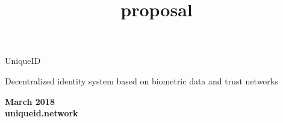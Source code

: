 \documentclass{article}
\title{proposal}
\begin{document}
\begin{titlepage}
\begin{center}
\begin{Huge}
UniqueID
\end{Huge}

\vspace{45mm}

\begin{huge}
Decentralized identity system based on biometric data and trust networks
\end{huge}


\vspace{85mm}

\textbf{ March 2018}
\\
\textbf{ uniqueid.network}
\end{center}
\end{titlepage}

\newpage
\end{document}
